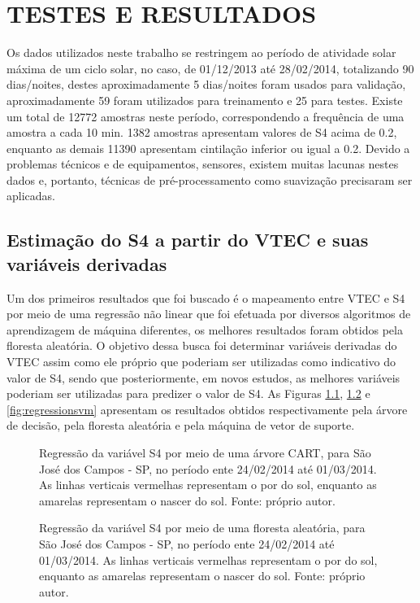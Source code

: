 \chapter{TESTES E RESULTADOS}

Os dados utilizados neste trabalho se restringem ao período de atividade solar máxima de um ciclo solar, no caso, de 01/12/2013 até 28/02/2014, totalizando 90 dias/noites, destes aproximadamente 5 dias/noites foram usados para validação, aproximadamente 59 foram utilizados para treinamento e 25 para testes. Existe um total de 12772 amostras neste período, correspondendo a frequência de uma amostra a cada 10 min. 1382 amostras apresentam valores de S4 acima de 0.2, enquanto as demais 11390 apresentam cintilação inferior ou igual a 0.2. Devido a problemas técnicos e de equipamentos, sensores, existem muitas lacunas nestes dados e, portanto, técnicas de pré-processamento como suavização precisaram ser aplicadas.

\section{Estimação do S4 a partir do VTEC e suas variáveis derivadas}

Um dos primeiros resultados que foi buscado é o mapeamento entre VTEC e S4 por meio de uma regressão não linear que foi efetuada por diversos algoritmos de aprendizagem de máquina diferentes, os melhores resultados foram obtidos pela floresta aleatória. O objetivo dessa busca foi determinar variáveis derivadas do VTEC assim como ele próprio que poderiam ser utilizadas como indicativo do valor de S4, sendo que posteriormente, em novos estudos, as melhores variáveis poderiam ser utilizadas para predizer o valor de S4. As Figuras \ref{fig:regressioncart}, \ref{fig:regressionrf} e \ref{fig:regressionsvm} apresentam os resultados obtidos respectivamente pela árvore de decisão, pela floresta aleatória e pela máquina de vetor de suporte. 

\begin{figure}
\centering
{}
\caption{Regressão da variável S4 por meio de uma árvore CART, para São José dos Campos - SP, no período ente 24/02/2014 até 01/03/2014. As linhas verticais vermelhas representam o por do sol, enquanto as amarelas representam o nascer do sol. Fonte: próprio autor.}
\label{fig:regressioncart}
\end{figure}

\begin{figure}
\centering
{}
\caption{Regressão da variável S4 por meio de uma floresta aleatória, para São José dos Campos - SP, no período ente 24/02/2014 até 01/03/2014. As linhas verticais vermelhas representam o por do sol, enquanto as amarelas representam o nascer do sol. Fonte: próprio autor.}
\label{fig:regressionrf}
\end{figure}


